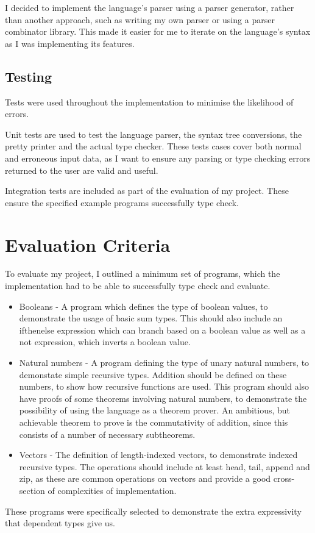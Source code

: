 \documentclass[12pt,a4paper,twoside]{report}
\begin{document}
I decided to implement the language's parser using a parser generator, rather than another approach, such as writing my own parser or using a parser combinator library.
This made it easier for me to iterate on the language's syntax as I was implementing its features.

\subsection{Testing}

Tests were used throughout the implementation to minimise the likelihood of errors.

Unit tests are used to test the language parser, the syntax tree conversions, the pretty printer and the actual type checker. 
These tests cases cover both normal and erroneous input data, as I want to ensure any parsing or type checking errors returned to the user are valid and useful.

Integration tests are included as part of the evaluation of my project.
These ensure the specified example programs successfully type check.

\section{Evaluation Criteria}
To evaluate my project, I outlined a minimum set of programs, which the implementation had to be able to successfully type check and evaluate.
\begin{itemize}
    \item Booleans - A program which defines the type of boolean values, to demonstrate the usage of basic sum types.
    This should also include an ifthenelse expression which can branch based on a boolean value as well as a not expression, which inverts a boolean value.
    \item Natural numbers - A program defining the type of unary natural numbers, to demonstate simple recursive types.
    Addition should be defined on these numbers, to show how recursive functions are used.
    This program should also have proofs of some theorems involving natural numbers, to demonstrate the possibility of using the language as a theorem prover.
    An ambitious, but achievable theorem to prove is the commutativity of addition, since this consists of a number of necessary subtheorems.
    \item Vectors - The definition of length-indexed vectors, to demonstrate indexed recursive types.
    The operations should include at least head, tail, append and zip, as these are common operations on vectors and provide a good cross-section of complexities of implementation.
\end{itemize}
These programs were specifically selected to demonstrate the extra expressivity that dependent types give us.
\end{document}
